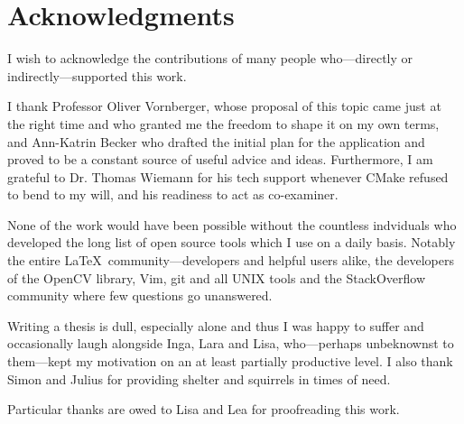 \chapter*{Acknowledgments}

I wish to acknowledge the contributions of many people who---directly or
indirectly---supported this work. 

I thank Professor Oliver Vornberger, whose proposal of this topic came just at
the right time and who granted me the freedom to shape it on my own terms, and
Ann-Katrin Becker who drafted the initial plan for the application and
proved to be a constant source of useful advice and ideas.  
Furthermore, I am grateful to Dr. Thomas Wiemann for his tech support
whenever CMake refused to bend to my will, and his readiness to act as
co-examiner.

None of the work would have been possible without the countless indviduals who
developed the long list of open source tools which I use on a daily basis.
Notably the entire \LaTeX\ community---developers and helpful users alike, the
developers of the OpenCV library, Vim, git and all UNIX tools and the
StackOverflow community where few questions go unanswered.

Writing a thesis is dull, especially alone and thus I was happy to suffer and
occasionally laugh alongside Inga, Lara and Lisa, who---perhaps unbeknownst to
them---kept my motivation on an at least partially productive level. I also
thank Simon and Julius for providing shelter and squirrels in times of need.

Particular thanks are owed to Lisa and Lea for proofreading this work.
